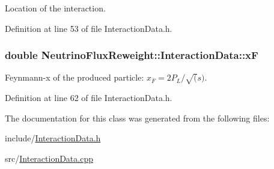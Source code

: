 Location of the interaction. 



Definition at line 53 of file Interaction\-Data.\-h.

\hypertarget{class_neutrino_flux_reweight_1_1_interaction_data_afd47c094f4fa78df269a0cfd5de2d6cd}{
\subsubsection[{x\-F}]{\setlength{\rightskip}{0pt plus 5cm}double Neutrino\-Flux\-Reweight\-::\-Interaction\-Data\-::x\-F}}\label{class_neutrino_flux_reweight_1_1_interaction_data_afd47c094f4fa78df269a0cfd5de2d6cd}


Feynmann-\/x of the produced particle\-: $ x_{F} = 2P_{L}/\sqrt(s) $. 



Definition at line 62 of file Interaction\-Data.\-h.



The documentation for this class was generated from the following files\-:\begin{DoxyCompactItemize}
\item 
include/\hyperlink{_interaction_data_8h}{Interaction\-Data.\-h}\item 
src/\hyperlink{_interaction_data_8cpp}{Interaction\-Data.\-cpp}\end{DoxyCompactItemize}
